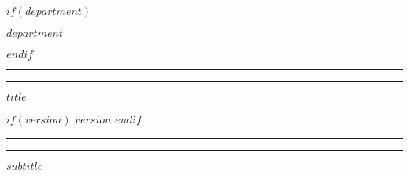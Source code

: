 \documentclass[
$if(fontsize)$
  $fontsize$,
$endif$
  a4paper
]{scrartcl}
\begin{document}
\begin{titlepage}

	\centering %
        \vspace{1.5\baselineskip} %

	$if(department)$
        \begin{flushleft}
		    \textsf{$department$}
	    \end{flushleft}
    $endif$


        \rule{\textwidth}{1.6pt}\vspace*{-\baselineskip}\vspace*{1.5pt} %

        \rule{\textwidth}{0.4pt}           %

        \vspace{1.5\baselineskip}          %

	{\LARGE \textbf{$title$}}          %

	\vspace{0.5\baselineskip}
    $if(version)$    
	{\Large \textbf{$version$}}        %
    $endif$

        \vspace{0.75\baselineskip}         %

        \rule{\textwidth}{0.4pt}\vspace*{-\baselineskip}\vspace{3pt} %

        \rule{\textwidth}{1.6pt}           %

        \vspace{2\baselineskip}            %


	{\large \textbf{$subtitle$}}


        \vspace*{4\baselineskip} %




\end{titlepage}
\end{document}
